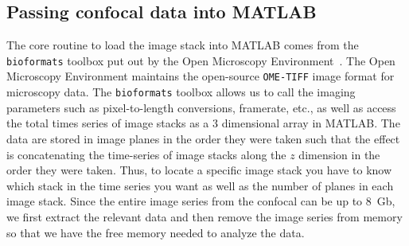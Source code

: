 \subsection{Passing confocal data into MATLAB}
The core routine to load the image stack into MATLAB comes from the \texttt{bioformats} toolbox put out by the Open Microscopy Environment~\cite{RN265}.
The Open Microscopy Environment maintains the open-source \texttt{OME-TIFF} image format for microscopy data.
The \texttt{bioformats} toolbox allows us to call the imaging parameters such as pixel-to-length conversions, framerate, etc., as well as access the total times series of image stacks as a 3 dimensional array in MATLAB.
The data are stored in image planes in the order they were taken such that the effect is concatenating the time-series of image stacks along the $z$ dimension in the order they were taken.
Thus, to locate a specific image stack you have to know which stack in the time series you want as well as the number of planes in each image stack.
Since the entire image series from the confocal can be up to 8~Gb, we first extract the relevant data and then remove the image series from memory so that we have the free memory needed to analyze the data.

